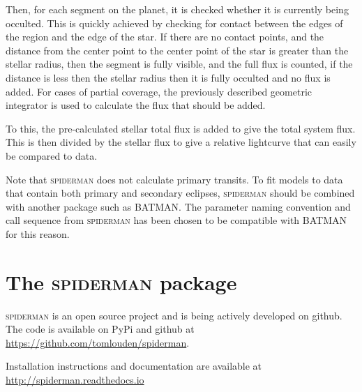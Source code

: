 \documentclass[a4paper,fleqn,usenatbib]{mnras}
\begin{document}
Then, for each segment on the planet, it is checked whether it is currently being occulted. This is quickly achieved by checking for contact between the edges of the region and the edge of the star. If there are no contact points, and the distance from the center point to the center point of the star is greater than the stellar radius, then the segment is fully visible, and the full flux is counted, if the distance is less then the stellar radius then it is fully occulted and no flux is added. For cases of partial coverage, the previously described geometric integrator is used to calculate the flux that should be added.

To this, the pre-calculated stellar total flux is added to give the total system flux. This is then divided by the stellar flux to give a relative lightcurve that can easily be compared to data.

Note that \textsc{spiderman} does not calculate primary transits. To fit models to data that contain both primary and secondary eclipses, \textsc{spiderman} should be combined with another package such as BATMAN. The parameter naming convention and call sequence from \textsc{spiderman} has been chosen to be compatible with BATMAN for this reason. 

\section{The \textsc{spiderman} package}\label{sec:package}

\textsc{spiderman} is an open source project and is being actively developed on github. The code is available on PyPi and github at \url{https://github.com/tomlouden/spiderman}.




Installation instructions and documentation are available at \url{http://spiderman.readthedocs.io}


\end{document}
